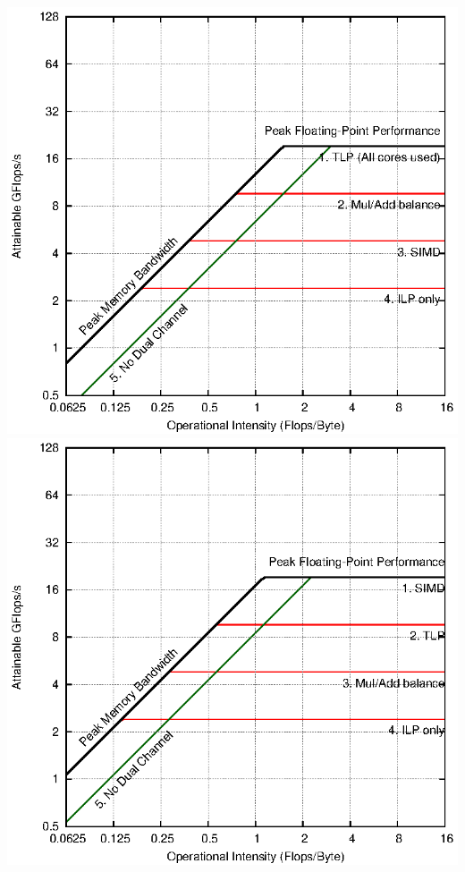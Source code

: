 \documentclass{article}
\begin{document}
\begin{center}
\includegraphics{roofline.eps}
\includegraphics{myroofline.eps}

\end{center}
\end{document}
